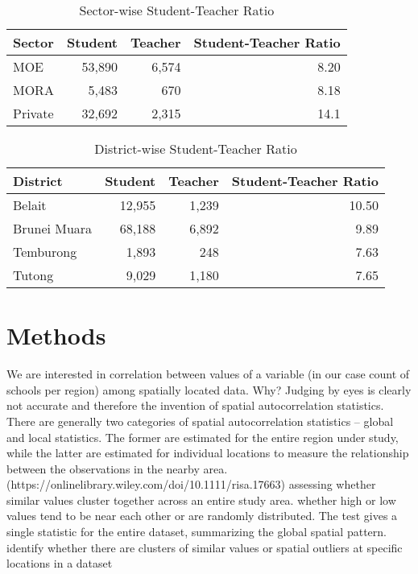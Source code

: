 \documentclass[12pt]{article}
\begin{document}

\begin{table}[h!]
\centering
\setlength{\tabcolsep}{15pt} %
\begin{tabular}{lrrr}
\hline
\textbf{Sector} & \textbf{Student} & \textbf{Teacher} & \textbf{Student-Teacher Ratio} \\ 
\hline
MOE             & 53,890           & 6,574            & 8.20                           \\
MORA            & 5,483            & 670              & 8.18                           \\
Private         & 32,692           & 2,315            & 14.1                           \\
\hline
\end{tabular}
\caption{Sector-wise Student-Teacher Ratio}
\end{table}

\begin{table}[h!]
\centering
\setlength{\tabcolsep}{10pt}
\begin{tabular}{lrrr}
\hline
\textbf{District}   & \textbf{Student}  & \textbf{Teacher}  & \textbf{Student-Teacher Ratio} \\ 
\hline
Belait              & 12,955            & 1,239             & 10.50 \\
Brunei Muara        & 68,188            & 6,892             & 9.89 \\
Temburong           & 1,893             & 248               & 7.63 \\
Tutong              & 9,029             & 1,180             & 7.65 \\ 
\hline
\end{tabular}
\caption{District-wise Student-Teacher Ratio}
\end{table}



\section{Methods}
We are interested in correlation between values of a variable (in our case count of schools per region) among spatially located data. Why? Judging by eyes is clearly not accurate and therefore the invention of spatial autocorrelation statistics. There are generally two categories of spatial autocorrelation statistics – global and local statistics. The former are estimated for the entire region under study, while the latter are estimated for individual locations to measure the relationship between the observations in the nearby area. (https://onlinelibrary.wiley.com/doi/10.1111/risa.17663)
assessing whether similar values cluster together across an entire study area. whether high or low values tend to be near each other or are randomly distributed. The test gives a single statistic for the entire dataset, summarizing the global spatial pattern.
identify whether there are clusters of similar values or spatial outliers at specific locations in a dataset
\end{document}

